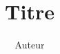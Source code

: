 \documentclass{hibiscus}
\title{Titre}
\author{Auteur}
\begin{document}
\coverpage                      %
\acknowledgements               %
\foreword                       %
\tableofcontents


% 



\figureslist                    %
\tableslist                     %
\scriptslist                    %
\bibliographyreferenceslist     %



\appendix
% 
\end{document}
